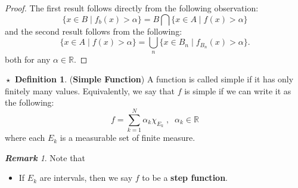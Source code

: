 \documentclass{article}
\theoremstyle{definition}
\newtheorem{definition}{$\boxed{\star}$ Definition}
\theoremstyle{remark}
\newtheorem*{remark}{\textbf{Remark}}
\theoremstyle{definition}
\theoremstyle{definition}
\theoremstyle{definition}
\newcommand{\bunion}{\bigcup}
\newcommand{\bintrs}{\bigcap}
\newcommand{\where}{\;\vert\;}
\newcommand{\R}{\mathbb{R}}
\begin{document}
\begin{proof}
	The first result follows directly from the following observation:
	\[\{x \in B\where f_b(x)>\alpha\} = B\bintrs \{x\in A\where f(x)>\alpha\}\]
	and the second result follows from the following:
	\[\{x\in A\where f(x)>\alpha\} = \bunion_{n} \{x\in B_n\where f_{B_n}(x) > \alpha\}.\]
	both for any $ \alpha\in \R $.
\end{proof}
\hrulefill
\begin{definition}\label{D-21}
	(\textbf{Simple Function}) A function is called simple if it has only finitely many values. Equivalently, we say that $ f $ is simple if we can write it as the following:
	\[f = \sum_{k=1}^{N}\alpha_k \chi_{E_k}\;,\;\;\alpha_{k}\in \R\]
	where each $ E_k $ is a measurable set of finite measure.
\end{definition}
\begin{remark}
	Note that \begin{itemize}
		\item {If $ E_k $ are intervals, then we say $ f $ to be a \textbf{step function}.}
	\end{itemize}
\end{remark}
\hrulefill
\end{document}
